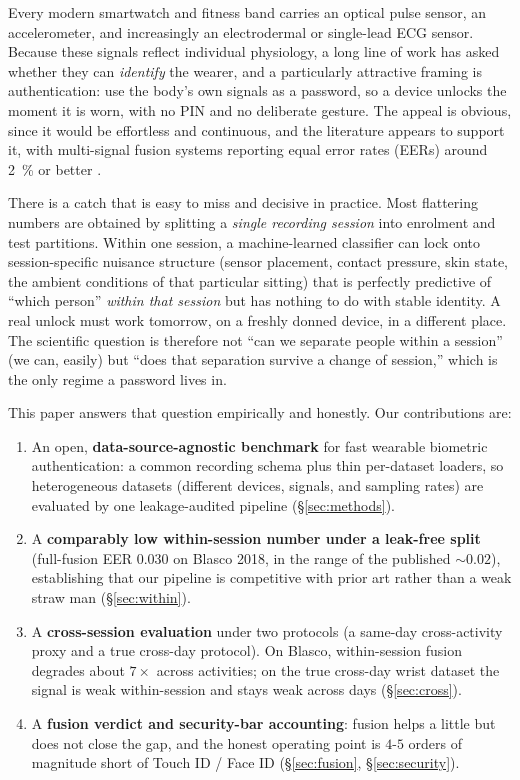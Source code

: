 \documentclass[11pt]{article}
\begin{document}
Every modern smartwatch and fitness band carries an optical pulse sensor, an accelerometer,
and increasingly an electrodermal or single-lead ECG sensor. Because these signals reflect
individual physiology, a long line of work has asked whether they can \emph{identify} the
wearer, and a particularly attractive framing is authentication: use the body's own signals
as a password, so a device unlocks the moment it is worn, with no PIN and no deliberate
gesture. The appeal is obvious, since it would be effortless and continuous, and the
literature appears to support it, with multi-signal fusion systems reporting equal error
rates (EERs) around \SI{2}{\percent} or better \citep{blasco2018}.

There is a catch that is easy to miss and decisive in practice. Most flattering numbers are
obtained by splitting a \emph{single recording session} into enrolment and test partitions.
Within one session, a machine-learned classifier can lock onto session-specific nuisance
structure (sensor placement, contact pressure, skin state, the ambient conditions of that
particular sitting) that is perfectly predictive of ``which person'' \emph{within that
session} but has nothing to do with stable identity. A real unlock must work tomorrow, on a
freshly donned device, in a different place. The scientific question is therefore not ``can
we separate people within a session'' (we can, easily) but ``does that separation survive a
change of session,'' which is the only regime a password lives in.

This paper answers that question empirically and honestly. Our contributions are:
\begin{enumerate}
  \item An open, \textbf{data-source-agnostic benchmark} for fast wearable biometric
  authentication: a common recording schema plus thin per-dataset loaders, so heterogeneous
  datasets (different devices, signals, and sampling rates) are evaluated by one leakage-audited
  pipeline (\S\ref{sec:methods}).
  \item A \textbf{comparably low within-session number under a leak-free split}
  (full-fusion EER \num{0.030} on Blasco 2018, in the range of the published ${\sim}0.02$),
  establishing that our pipeline is competitive with prior art rather than a weak straw man
  (\S\ref{sec:within}).
  \item A \textbf{cross-session evaluation} under two protocols (a same-day cross-activity
  proxy and a true cross-day protocol). On Blasco, within-session fusion degrades about
  $7\times$ across activities; on the true cross-day wrist dataset the signal is weak
  within-session and stays weak across days (\S\ref{sec:cross}).
  \item A \textbf{fusion verdict and security-bar accounting}: fusion helps a little but does
  not close the gap, and the honest operating point is $4$-$5$ orders of magnitude short of
  Touch ID / Face ID (\S\ref{sec:fusion}, \S\ref{sec:security}).
\end{enumerate}
\end{document}
